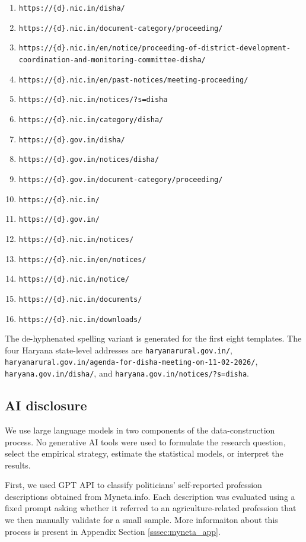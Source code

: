\documentclass[12pt]{article}
\begin{document}
\begin{enumerate}
\item \texttt{https://\{d\}.nic.in/disha/}
\item \texttt{https://\{d\}.nic.in/document-category/proceeding/}
\item \texttt{https://\{d\}.nic.in/en/notice/proceeding-of-district-development-coordination-and-monitoring-committee-disha/}
\item \texttt{https://\{d\}.nic.in/en/past-notices/meeting-proceeding/}
\item \texttt{https://\{d\}.nic.in/notices/?s=disha}
\item \texttt{https://\{d\}.nic.in/category/disha/}
\item \texttt{https://\{d\}.gov.in/disha/}
\item \texttt{https://\{d\}.gov.in/notices/disha/}
\item \texttt{https://\{d\}.gov.in/document-category/proceeding/}
\item \texttt{https://\{d\}.nic.in/}
\item \texttt{https://\{d\}.gov.in/}
\item \texttt{https://\{d\}.nic.in/notices/}
\item \texttt{https://\{d\}.nic.in/en/notices/}
\item \texttt{https://\{d\}.nic.in/notice/}
\item \texttt{https://\{d\}.nic.in/documents/}
\item \texttt{https://\{d\}.nic.in/downloads/}
\end{enumerate}

The de-hyphenated spelling variant is generated for the first eight templates. The four Haryana state-level addresses are \texttt{haryanarural.gov.in/}, \texttt{haryanarural.gov.in/agenda-for-disha-meeting-on-11-02-2026/}, \texttt{haryana.gov.in/disha/}, and \texttt{haryana.gov.in/notices/?s=disha}.


 \subsection{AI disclosure}\label{ssec:ai}



We use large language models in two components of the data-construction process. No generative AI tools were used to formulate the research question, select the empirical strategy, estimate the statistical models, or interpret the results.

First, we used GPT API to classify politicians’ self-reported profession descriptions obtained from Myneta.info. Each description was evaluated using a fixed prompt asking whether it referred to an agriculture-related profession that we then manually validate for a small sample. More informaiton about this process is present in Appendix Section \ref{sssec:myneta_app}.
\end{document}
